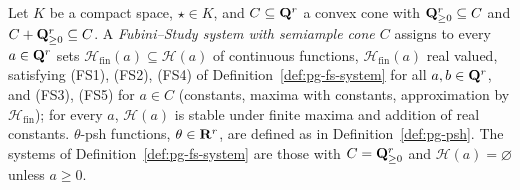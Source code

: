 \begin{definition}\label{def:gl-fs-system}
\leanok
{}
Let $K$ be a compact space, $\star\in K$, and $C\subseteq\mathbf{Q}^r$ a convex cone with $\mathbf{Q}^r_{\ge0}\subseteq C$ and $C+\mathbf{Q}^r_{\ge0}\subseteq C$. A
\emph{Fubini--Study system with semiample cone $C$} assigns to every $a\in\mathbf{Q}^r$ sets $\mathcal H_{\mathrm{fin}}(a)\subseteq\mathcal H(a)$ of
continuous functions, $\mathcal H_{\mathrm{fin}}(a)$ real valued, satisfying (FS1), (FS2), (FS4) of Definition~\ref{def:pg-fs-system} for all
$a,b\in\mathbf{Q}^r$, and (FS3), (FS5) for $a\in C$ (constants, maxima with constants, approximation by $\mathcal H_{\mathrm{fin}}$); for every $a$,
$\mathcal H(a)$ is stable under finite maxima and addition of real constants. $\theta$-psh functions, $\theta\in\mathbf{R}^r$, are defined as in
Definition~\ref{def:pg-psh}. The systems of Definition~\ref{def:pg-fs-system} are those with $C=\mathbf{Q}^r_{\ge0}$ and $\mathcal H(a)=\varnothing$ unless
$a\ge0$.
\end{definition}

